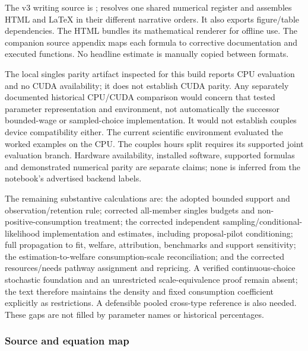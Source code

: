 \documentclass[11pt,a4paper]{article}
\begin{document}
The v3 writing source is ;  resolves one shared numerical register and assembles HTML and LaTeX in their different narrative orders. It also exports figure/table dependencies. The HTML bundles its mathematical renderer for offline use. The companion source appendix maps each formula to corrective documentation and executed functions. No headline estimate is manually copied between formats.

The local singles parity artifact inspected for this build reports CPU evaluation and no CUDA availability; it does not establish CUDA parity. Any separately documented historical CPU/CUDA comparison would concern that tested parameter representation and environment, not automatically the successor bounded-wage or sampled-choice implementation. It would not establish couples device compatibility either. The current scientific environment evaluated the worked examples on the CPU. The couples hours split requires its supported joint evaluation branch. Hardware availability, installed software, supported formulas and demonstrated numerical parity are separate claims; none is inferred from the notebook's advertised backend labels.

The remaining substantive calculations are: the adopted bounded support and observation/retention rule; corrected all-member singles budgets and non-positive-consumption treatment; the corrected independent sampling/conditional-likelihood implementation and estimates, including proposal-pilot conditioning; full propagation to fit, welfare, attribution, benchmarks and support sensitivity; the estimation-to-welfare consumption-scale reconciliation; and the corrected resources/needs pathway assignment and repricing. A verified continuous-choice stochastic foundation and an unrestricted scale-equivalence proof remain absent; the text therefore maintains the density and fixed consumption coefficient explicitly as restrictions. A defensible pooled cross-type reference is also needed. These gaps are not filled by parameter names or historical percentages.

\subsubsection{Source and equation map}\label{source-and-equation-map}
\end{document}
